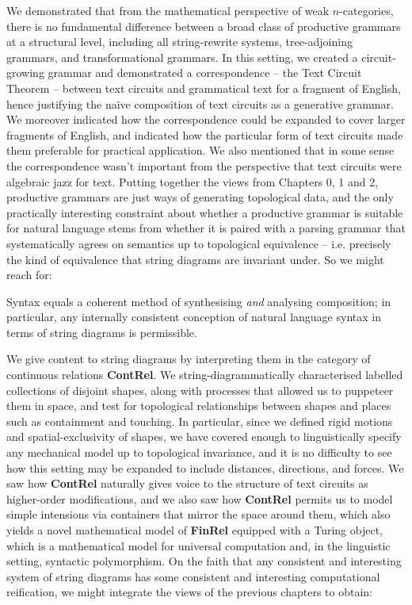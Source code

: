  We demonstrated that from the  mathematical perspective of weak $n$-categories, there is no fundamental difference between a broad class of productive grammars at a structural level, including all string-rewrite systems, tree-adjoining grammars, and transformational grammars. In this setting, we created a circuit-growing grammar and demonstrated a correspondence -- the Text Circuit Theorem -- between text circuits and grammatical text for a fragment of English, hence justifying the na\"{i}ve composition of text circuits as a generative grammar. We moreover indicated how the correspondence could be expanded to cover larger fragments of English, and indicated how the particular form of text circuits made them preferable for practical application. We also mentioned that in some sense the correspondence wasn't important from the perspective that text circuits were algebraic jazz for text. Putting together the views from Chapters 0, 1 and 2, productive grammars are just ways of generating topological data, and the only practically interesting constraint about whether a productive grammar is suitable for natural language stems from whether it is paired with a parsing grammar that systematically agrees on semantics up to topological equivalence -- i.e. precisely the kind of equivalence that string diagrams are invariant under. So we might reach for:

\begin{thesis}
Syntax equals a coherent method of synthesising \emph{and} analysing composition; in particular, any internally consistent conception of natural language syntax in terms of string diagrams is permissible.
\end{thesis}

 We give content to string diagrams by interpreting them in the category of continuous relations \textbf{ContRel}. We string-diagrammatically characterised labelled collections of disjoint shapes, along with processes that allowed us to puppeteer them in space, and test for topological relationships between shapes and places such as containment and touching. In particular, since we defined rigid motions and spatial-exclusivity of shapes, we have covered enough to linguistically specify any mechanical model up to topological invariance, and it is no difficulty to see how this setting may be expanded to include distances, directions, and forces. We saw how \textbf{ContRel} naturally gives voice to the structure of text circuits as higher-order modifications, and we also saw how \textbf{ContRel} permits us to model simple intensions via containers that mirror the space around them, which also yields a novel mathematical model of \textbf{FinRel} equipped with a Turing object, which is a mathematical model for universal computation and, in the linguistic setting, syntactic polymorphism. On the faith that any consistent and interesting system of string diagrams has some consistent and interesting computational reification, we might integrate the views of the previous chapters to obtain:

